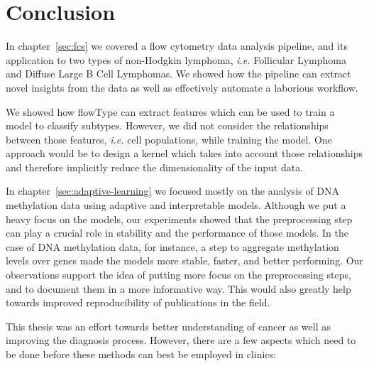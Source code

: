 \chapter{Conclusion}
In chapter~\ref{sec:fcs} we covered a flow cytometry data analysis pipeline,
and its application to two types of non-Hodgkin lymphoma, \emph{i.e.}
Follicular Lymphoma and Diffuse Large B Cell Lymphomas. We showed how the
pipeline can extract novel insights from the data as well as effectively
automate a laborious workflow.

We showed how flowType can extract features which can be used to train a model
to classify subtypes. However, we did not consider the relationships between
those features, \emph{i.e.} cell populations, while training the model. One
approach would be to design a kernel which takes into account those
relationships and therefore implicitly reduce the dimensionality of the input
data.

In chapter~\ref{sec:adaptive-learning} we focused mostly on the analysis of DNA
methylation data using adaptive and interpretable models. Although we put a
heavy focus on the models, our experiments showed that the preprocessing step
can play a crucial role in stability and the performance of those models. In
the case of DNA methylation data, for instance, a step to aggregate methylation
levels over genes made the models more stable, faster, and better performing.
Our observations support the idea of putting more focus on the preprocessing
steps, and to document them in a more informative way. This would also greatly
help towards improved reproducibility of publications in the field.

This thesis was an effort towards better understanding of cancer as well as
improving the diagnosis process. However, there are a few aspects which need to
be done before these methods can best be employed in clinics:

